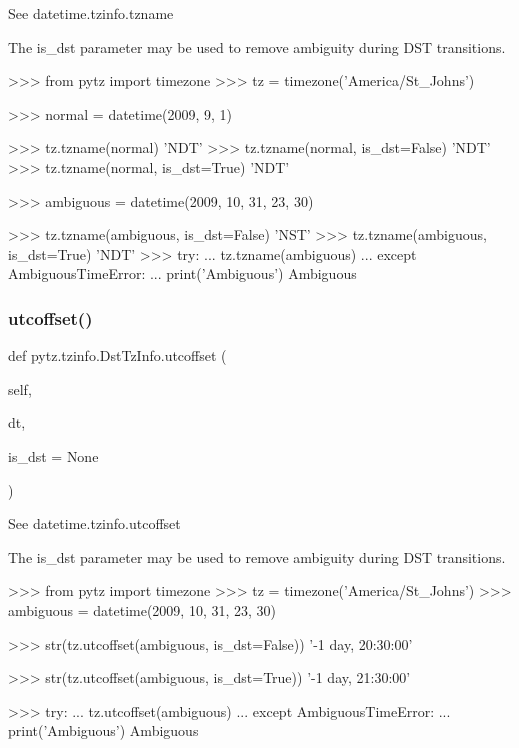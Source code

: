 \begin{DoxyVerb}See datetime.tzinfo.tzname

The is_dst parameter may be used to remove ambiguity during DST
transitions.

>>> from pytz import timezone
>>> tz = timezone('America/St_Johns')

>>> normal = datetime(2009, 9, 1)

>>> tz.tzname(normal)
'NDT'
>>> tz.tzname(normal, is_dst=False)
'NDT'
>>> tz.tzname(normal, is_dst=True)
'NDT'

>>> ambiguous = datetime(2009, 10, 31, 23, 30)

>>> tz.tzname(ambiguous, is_dst=False)
'NST'
>>> tz.tzname(ambiguous, is_dst=True)
'NDT'
>>> try:
...     tz.tzname(ambiguous)
... except AmbiguousTimeError:
...     print('Ambiguous')
Ambiguous
\end{DoxyVerb}
 \mbox{\label{classpytz_1_1tzinfo_1_1DstTzInfo_a9d88b72000f482255287ff9ad6ca2f07}} 
\subsubsection{\texorpdfstring{utcoffset()}{utcoffset()}}
{\footnotesize\ttfamily def pytz.\+tzinfo.\+Dst\+Tz\+Info.\+utcoffset (\begin{DoxyParamCaption}\item[{}]{self,  }\item[{}]{dt,  }\item[{}]{is\+\_\+dst = {\ttfamily None} }\end{DoxyParamCaption})}

\begin{DoxyVerb}See datetime.tzinfo.utcoffset

The is_dst parameter may be used to remove ambiguity during DST
transitions.

>>> from pytz import timezone
>>> tz = timezone('America/St_Johns')
>>> ambiguous = datetime(2009, 10, 31, 23, 30)

>>> str(tz.utcoffset(ambiguous, is_dst=False))
'-1 day, 20:30:00'

>>> str(tz.utcoffset(ambiguous, is_dst=True))
'-1 day, 21:30:00'

>>> try:
...     tz.utcoffset(ambiguous)
... except AmbiguousTimeError:
...     print('Ambiguous')
Ambiguous\end{DoxyVerb}
 

